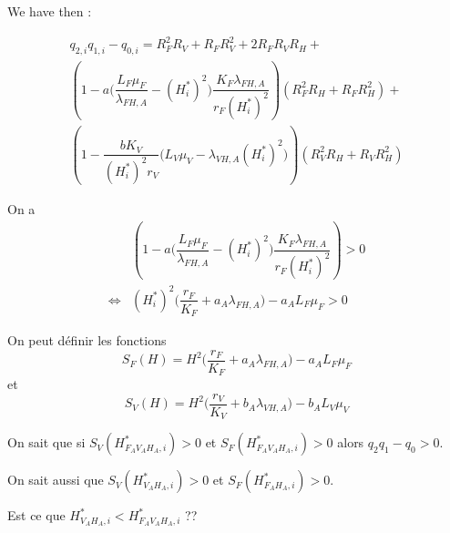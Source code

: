 \documentclass{article}
\newcommand{\lfa}{\lambda_{FH, A}}
\newcommand{\lva}{\lambda_{VH, A}}
\begin{document}
\begin{itemize}
We have then :

\begin{subequations}
\begin{multline}
q_{2,i}q_{1,i} -q_{0,i} = R_F^2R_V + R_FR_V^2 + 2 R_FR_VR_H + \\
\left(1 - a \Big(\dfrac{L_F\mu_F}{\lfa}-(H^*_i)^2\Big) \dfrac{K_F\lfa}{r_F(H^*_i)^2}\right) \left(R_F^2R_H + R_FR_H^2\right) + \\
\left( 1 - \dfrac{b K_V}{(H^*_i)^2r_V}\Big(L_V\mu_V- \lva(H^*_i)^2\Big) \right) \left(R_V^2R_H + R_VR_H^2\right) 
\end{multline}
\end{subequations}

On a 
\begin{align*}
&\left(1 - a \Big(\dfrac{L_F\mu_F}{\lfa}-(H^*_i)^2\Big) \dfrac{K_F\lfa}{r_F(H^*_i)^2}\right) > 0 \\
\Leftrightarrow &(H^*_i)^2 \Big(\dfrac{r_F}{K_F} + a_A \lfa \Big) - a_AL_F \mu_F > 0
\end{align*}
 

On peut définir les fonctions 
\begin{equation}
S_F(H) = H^2 \Big(\dfrac{r_F}{K_F} + a_A \lfa \Big) - a_AL_F \mu_F
\end{equation}
et 
\begin{equation}
S_V(H) = H^2 \Big(\dfrac{r_V}{K_V} + b_A \lva \Big) - b_AL_V \mu_V
\end{equation}


On sait que si $S_V(H^*_{F_AV_AH_A,i}) > 0$ et $S_F(H^*_{F_AV_AH_A,i}) > 0$ alors $q_2q_1 - q_0 > 0$.

On sait aussi que $S_V(H^*_{V_AH_A,i}) > 0$ et $S_F(H^*_{F_AH_A,i}) > 0$.

Est ce que $H^*_{V_AH_A,i} < H^*_{F_AV_AH_A,i}$ ??

\end{itemize}


\newpage
\end{document}
